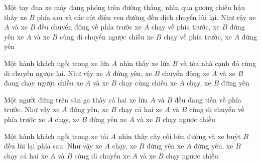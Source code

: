 \begin{ex}
Một tay đua xe máy đang phóng trên đường thẳng, nhìn qua gương chiếu hậu thấy xe $B$ phía sau và các cột điện ven đường đều dịch chuyển lùi lại. Như vậy
\choice
{xe $A$ và xe $B$ đều chuyển động về phía trước}
{\True xe $A$ chạy về phía trước, xe $B$ đứng yên}
{xe $A$ và xe $B$ cùng di chuyển ngược chiều}
{xe $B$ chạy về phía trước, xe $A$ đứng yên}
\end{ex}

\begin{ex}
Một hành khách ngồi trong xe lửa $A$ nhìn thấy xe lửa $B$ và tòa nhà cạnh đó cùng di chuyển ngược lại. Như vậy
\choice
{xe $A$ đứng yên, xe $B$ chuyển động}
{\True xe $A$ và xe $B$ đang chạy ngược chiều}
{xe $A$ và xe $B$ chạy cùng chiều}
{xe $A$ chạy, xe $B$ đứng yên}
\end{ex}

\begin{ex}
Một người đứng trên sân ga thấy cả hai xe lửa $A$ và $B$ đều đang tiến về phía trước. Như vậy
\choice
{xe $A$ đứng yên, xe $B$ chạy}
{\True cả hai xe $A$ và $B$ cùng di chuyển về phía trước}
{xe $A$ chạy, xe $B$ đứng yên}
{xe $A$ và xe $B$ chạy ngược chiều}
\end{ex}

\begin{ex}
Một hành khách ngồi trong xe tải $A$ nhìn thấy cây cối bên đường và xe buýt $B$ đều lùi lại phía sau. Như vậy
\choice
{\True xe $A$ chạy, xe $B$ đứng yên}
{xe $A$ đứng yên, xe $B$ chạy}
{cả hai xe $A$ và $B$ cùng di chuyển}
{xe $A$ và xe $B$ chạy ngược chiều}
\end{ex}

